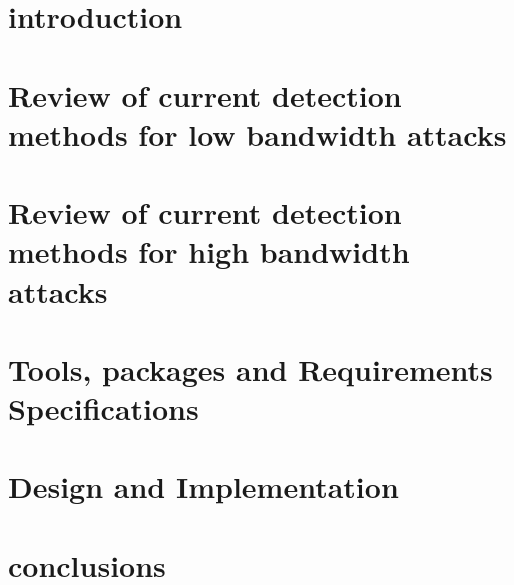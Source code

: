 \documentclass[11pt,twoside]{book}
\begin{document}
%
%
%
%
\tableofcontents

\mainmatter
\chapter{introduction}
\chapter{Review of current detection methods for low bandwidth attacks}

\chapter{Review of current detection methods for high bandwidth attacks}

\chapter{Tools, packages and Requirements Specifications}

\chapter{Design and Implementation}

\chapter{conclusions}

\printbibliography
%
%
%
%
%
\end{document}
